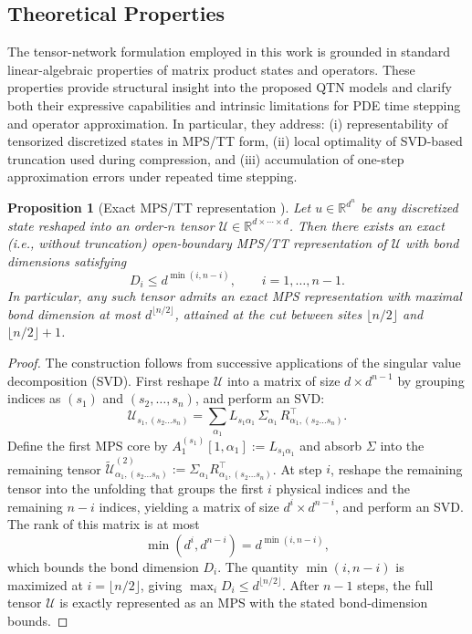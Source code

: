 \documentclass[letterpaper, 10 pt, conference]{ieeeconf}  %
\newtheorem{proposition}{Proposition}%
\begin{document}
\subsection{Theoretical Properties}
\label{sec:theory}
The tensor-network formulation employed in this work is grounded in standard
linear-algebraic properties of matrix product states and operators. These
properties provide structural insight into the proposed QTN models and clarify
both their expressive capabilities and intrinsic limitations for PDE time
stepping and operator approximation. In particular, they address: (i)
representability of tensorized discretized states in MPS/TT form, (ii) local
optimality of SVD-based truncation used during compression, and (iii)
accumulation of one-step approximation errors under repeated time stepping.

\begin{proposition}[Exact MPS/TT representation
]
\label{prop:mps-exact}
Let $u \in \mathbb{R}^{d^n}$ be any discretized state reshaped into an order-$n$
tensor $\mathcal{U} \in \mathbb{R}^{d \times \cdots \times d}$. Then there exists
an exact (i.e., without truncation) open-boundary MPS/TT representation of $\mathcal{U}$ with bond
dimensions satisfying
\[
D_i \le d^{\min(i,n-i)}, \qquad i=1,\dots,n-1.
\]
In particular, any such tensor admits an exact MPS representation with maximal
bond dimension at most $d^{\lfloor n/2 \rfloor}$, attained at the cut between
sites $\lfloor n/2 \rfloor$ and $\lfloor n/2 \rfloor+1$.
\end{proposition}

\begin{proof}
The construction follows from successive applications of the singular value
decomposition (SVD). First reshape $\mathcal{U}$ into a matrix of size
$d \times d^{n-1}$ by grouping indices as $(s_1)$ and $(s_2,\dots,s_n)$, and
perform an SVD:
\[
\mathcal{U}_{s_1,(s_2 \dots s_n)}
= \sum_{\alpha_1}
L_{s_1 \alpha_1}\, \Sigma_{\alpha_1}\,
R^\top_{\alpha_1,(s_2 \dots s_n)}.
\]
Define the first MPS core by $A_1^{(s_1)}[1,\alpha_1] := L_{s_1\alpha_1}$ and
absorb $\Sigma$ into the remaining tensor
$\widetilde{\mathcal{U}}^{(2)}_{\alpha_1,(s_2 \dots s_n)}
:= \Sigma_{\alpha_1} R^\top_{\alpha_1,(s_2 \dots s_n)}$.
At step $i$, reshape the remaining tensor into the unfolding that groups the
first $i$ physical indices and the remaining $n-i$ indices, yielding a matrix
of size $d^i \times d^{n-i}$, and perform an SVD. The rank of this matrix is at
most
\[
\min(d^i, d^{n-i}) = d^{\min(i,n-i)},
\]
which bounds the bond dimension $D_i$. The quantity $\min(i,n-i)$ is maximized
at $i=\lfloor n/2 \rfloor$, giving $\max_i D_i \le d^{\lfloor n/2 \rfloor}$.
After $n-1$ steps, the full tensor $\mathcal{U}$ is exactly represented as an
MPS with the stated bond-dimension bounds.
\end{proof}
\end{document}
